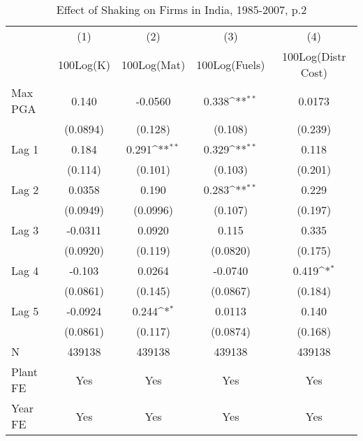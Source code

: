 \begin{table}[htbp]\centering
\def\sym#1{\ifmmode^{#1}\else\(^{#1}\)\fi}
\caption{Effect of Shaking on Firms in India, 1985-2007, p.2}
\begin{tabular}{l*{4}{c}}
\toprule
                &\multicolumn{1}{c}{(1)}&\multicolumn{1}{c}{(2)}&\multicolumn{1}{c}{(3)}&\multicolumn{1}{c}{(4)}\\
                &\multicolumn{1}{c}{100Log(K)}&\multicolumn{1}{c}{100Log(Mat)}&\multicolumn{1}{c}{100Log(Fuels)}&\multicolumn{1}{c}{100Log(Distr Cost)}\\
\midrule
Max PGA         &    0.140         &  -0.0560         &    0.338\sym{**} &   0.0173         \\
                & (0.0894)         &  (0.128)         &  (0.108)         &  (0.239)         \\
\addlinespace
Lag 1           &    0.184         &    0.291\sym{**} &    0.329\sym{**} &    0.118         \\
                &  (0.114)         &  (0.101)         &  (0.103)         &  (0.201)         \\
\addlinespace
Lag 2           &   0.0358         &    0.190         &    0.283\sym{**} &    0.229         \\
                & (0.0949)         & (0.0996)         &  (0.107)         &  (0.197)         \\
\addlinespace
Lag 3           &  -0.0311         &   0.0920         &    0.115         &    0.335         \\
                & (0.0920)         &  (0.119)         & (0.0820)         &  (0.175)         \\
\addlinespace
Lag 4           &   -0.103         &   0.0264         &  -0.0740         &    0.419\sym{*}  \\
                & (0.0861)         &  (0.145)         & (0.0867)         &  (0.184)         \\
\addlinespace
Lag 5           &  -0.0924         &    0.244\sym{*}  &   0.0113         &    0.140         \\
                & (0.0861)         &  (0.117)         & (0.0874)         &  (0.168)         \\
\midrule
N               &   439138         &   439138         &   439138         &   439138         \\
Plant FE        &      Yes         &      Yes         &      Yes         &      Yes         \\
Year FE         &      Yes         &      Yes         &      Yes         &      Yes         \\

\end{tabular}
\end{table}
